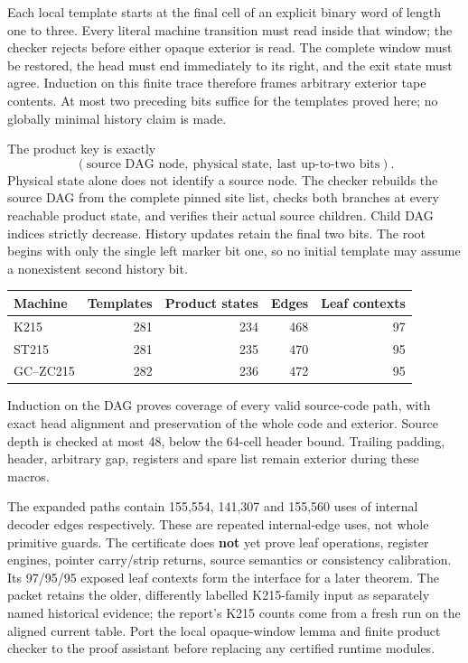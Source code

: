 \documentclass[11pt]{article}
\begin{document}
Each local template starts at the final cell of an explicit binary word of length one to three. Every literal machine transition must read inside that window; the checker rejects before either opaque exterior is read. The complete window must be restored, the head must end immediately to its right, and the exit state must agree. Induction on this finite trace therefore frames arbitrary exterior tape contents. At most two preceding bits suffice for the templates proved here; no globally minimal history claim is made.

The product key is exactly
\[
 (\text{source DAG node},\ \text{physical state},\ \text{last up-to-two bits}).
\]
Physical state alone does not identify a source node. The checker rebuilds the source DAG from the complete pinned site list, checks both branches at every reachable product state, and verifies their actual source children. Child DAG indices strictly decrease. History updates retain the final two bits. The root begins with only the single left marker bit one, so no initial template may assume a nonexistent second history bit.

\begin{center}
\begin{tabular}{lrrrr}
\toprule
Machine & Templates & Product states & Edges & Leaf contexts\\
\midrule
K215 & 281 & 234 & 468 & 97\\
ST215 & 281 & 235 & 470 & 95\\
GC--ZC215 & 282 & 236 & 472 & 95\\
\bottomrule
\end{tabular}
\end{center}
Induction on the DAG proves coverage of every valid source-code path, with exact head alignment and preservation of the whole code and exterior. Source depth is checked at most 48, below the 64-cell header bound. Trailing padding, header, arbitrary gap, registers and spare list remain exterior during these macros.

The expanded paths contain 155,554, 141,307 and 155,560 uses of internal decoder edges respectively. These are repeated internal-edge uses, not whole primitive guards. The certificate does \textbf{not} yet prove leaf operations, register engines, pointer carry/strip returns, source semantics or consistency calibration. Its 97/95/95 exposed leaf contexts form the interface for a later theorem. The packet retains the older, differently labelled K215-family input as separately named historical evidence; the report's K215 counts come from a fresh run on the aligned current table. Port the local opaque-window lemma and finite product checker to the proof assistant before replacing any certified runtime modules.
\end{document}
